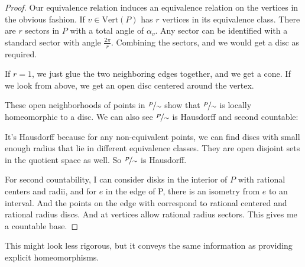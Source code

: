 \begin{enumerate}
\begin{proof}
        Our equivalence relation induces an equivalence relation on the vertices in the obvious fashion. If \(v \in \mathrm{Vert}(P)\) has \(r\) vertices in its equivalence class. There are \(r\) sectors in \(P\) with a total angle of \(\alpha_v\). Any sector can be identified with a standard sector with angle \(\frac{2\pi}{r}\). Combining the sectors, and we would get a disc as required.

        If \(r = 1\), we just glue the two neighboring edges together, and we get a cone. If we look from above, we get an open disc centered around the vertex.

        These open neighborhoods of points in \(\nicefrac{P}{\sim}\) show that \(\nicefrac{P}{\sim}\) is locally homeomorphic to a disc. We can also see \(\nicefrac{P}{\sim}\) is Hausdorff and second countable:

        It's Hausdorff because for any non-equivalent points, we can find discs with small enough radius that lie in different equivalence classes. They are open disjoint sets in the quotient space as well. So \(\nicefrac{P}{\sim}\) is Hausdorff.

        For second countability, I can consider disks in the interior of \(P\) with rational centers and radii, and for \(e\) in the edge of P, there is an isometry from \(e\) to an interval. And the points on the edge with correspond to rational centered and rational radius discs. And at vertices allow rational radius sectors. This gives me a countable base.
    \end{proof}
    \begin{remark}
        This might look less rigorous, but it conveys the same information as providing explicit homeomorphisms.
    \end{remark}
\end{enumerate}